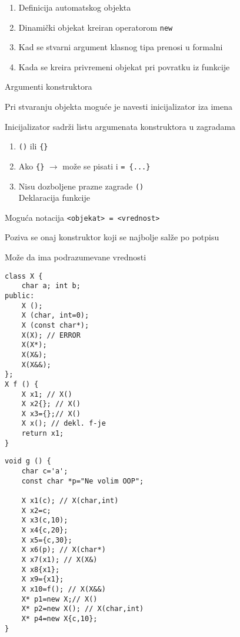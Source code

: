 \documentclass{article}
\newenvironment{xitemize}{%
    
    \itemize
    \larger
}{%
    \enditemize
}
\let\olditemize\itemize
\let\endolditemize\enditemize
\renewenvironment{itemize}{%
    \smaller
    \olditemize
}{%
    \endolditemize
}
\providecommand{\inlinecode}[1]{\texttt{#1}}
\begin{document}
\begin{xitemize}
\begin{enumerate}
    \item Definicija automatskog objekta
    \item Dinamički objekat kreiran operatorom \inlinecode{new}
    \item Kad se stvarni argument klasnog tipa prenosi u formalni
    \item Kada se kreira privremeni objekat pri povratku iz funkcije
\end{enumerate}
\item Argumenti konstruktora
\begin{itemize}
    \item Pri stvaranju objekta moguće je navesti inicijalizator iza imena
    \item Inicijalizator sadrži listu argumenata konstruktora u zagradama
    \begin{enumerate}
        \item \inlinecode{()} ili \inlinecode{\{\}}
        \item Ako \inlinecode{\{\}} $\rightarrow$ može se pisati i \inlinecode{= \{...\}}
        \item Nisu dozboljene prazne zagrade \inlinecode{()}\\
        Deklaracija funkcije
    \end{enumerate}
    \item Moguća notacija \inlinecode{<objekat>  = <vrednost>}
    \item Poziva se onaj konstruktor koji se najbolje salže po potpisu
    \item Može da ima podrazumevane vrednosti
    
    \begin{multicols}{2}
    \begin{lstlisting}
class X {
    char a; int b;
public:
    X ();
    X (char, int=0);
    X (const char*);
    X(X); // ERROR
    X(X*);
    X(X&);
    X(X&&);
};
X f () {
    X x1; // X()
    X x2{}; // X()
    X x3={};// X()
    X x(); // dekl. f-je
    return x1;
}
\end{lstlisting}
\columnbreak
\begin{lstlisting}
void g () {
    char c='a';
    const char *p="Ne volim OOP";
    
    X x1(c); // X(char,int)
    X x2=c;
    X x3(c,10);
    X x4{c,20};
    X x5={c,30};
    X x6(p); // X(char*)
    X x7(x1); // X(X&)
    X x8{x1};
    X x9={x1};
    X x10=f(); // X(X&&)
    X* p1=new X;// X()
    X* p2=new X(); // X(char,int)
    X* p4=new X{c,10};
}
    

\end{lstlisting}
\end{multicols}
\end{itemize}
\end{xitemize}
\end{document}
